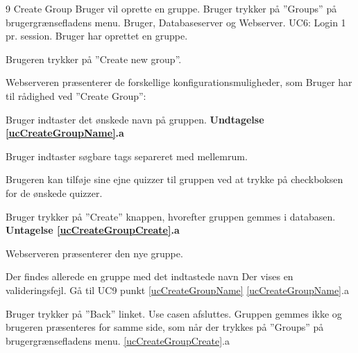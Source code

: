 
\uchead
	{9}
	{Create Group}
	{Bruger vil oprette en gruppe.}
	{Bruger trykker på ''Groups'' på brugergrænsefladens menu.}
	{Bruger, Databaseserver og Webserver.}
	{UC6: Login}
	{1 pr. session.}
	{Bruger har oprettet en gruppe.}
\item Brugeren trykker på ''Create new group''.

\item Webserveren præsenterer de forskellige konfigurationsmuligheder, som Bruger har til rådighed ved ''Create Group'':

\item \label{ucCreateGroupName} Bruger indtaster det ønskede navn på gruppen. \textbf{Undtagelse \ref{ucCreateGroupName}.a}

\item Bruger indtaster søgbare tags separeret med mellemrum.
\item Brugeren kan tilføje sine ejne quizzer til gruppen ved at trykke på checkboksen for de ønskede quizzer.

\item \label{ucCreateGroupCreate} Bruger trykker på ''Create'' knappen, hvorefter gruppen gemmes i databasen.
\textbf{Untagelse \ref{ucCreateGroupCreate}.a}

\item Webserveren præsenterer den nye gruppe.

\ucdescriptionend

\ucextension
	{Der findes allerede en gruppe med det indtastede navn}
	{Der vises en valideringsfejl. Gå til UC9 punkt \ref{ucCreateGroupName}}
	{\ref{ucCreateGroupName}.a}
		
\ucextension
	{Bruger trykker på ''Back'' linket.}
	{Use casen afsluttes. Gruppen gemmes ikke og brugeren præsenteres for samme side, som når der trykkes på ''Groups'' på brugergrænsefladens menu.}
	{\ref{ucCreateGroupCreate}.a}

